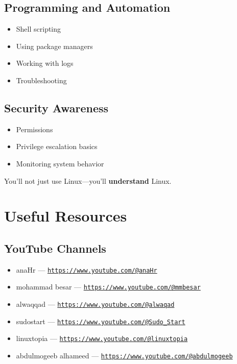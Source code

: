 \documentclass[12pt]{article}
\begin{document}
\subsection*{Programming and Automation}
\begin{itemize}
    \item Shell scripting
    \item Using package managers
    \item Working with logs
    \item Troubleshooting
\end{itemize}

\subsection*{Security Awareness}
\begin{itemize}
    \item Permissions
    \item Privilege escalation basics
    \item Monitoring system behavior
\end{itemize}

\begin{highlightbox}
You'll not just use Linux—you'll \textbf{understand} Linux.
\end{highlightbox}

\section*{Useful Resources}

\subsection*{YouTube Channels}
\begin{itemize}
    \item anaHr — \href{https://www.youtube.com/@anaHr}{\texttt{https://www.youtube.com/@anaHr}}
    \item mohammad besar — \href{https://www.youtube.com/@mmbesar}{\texttt{https://www.youtube.com/@mmbesar}}
    \item alwaqqad — \href{https://www.youtube.com/@alwaqad}{\texttt{https://www.youtube.com/@alwaqad}}
    \item sudostart — \href{https://www.youtube.com/@Sudo\_Start}{\texttt{https://www.youtube.com/@Sudo\_Start}}
    \item linuxtopia — \href{https://www.youtube.com/@linuxtopia}{\texttt{https://www.youtube.com/@linuxtopia}}
    \item  abdulmogeeb alhameed — \href{https://www.youtube.com/@abdulmogeeb}{\texttt{https://www.youtube.com/@abdulmogeeb}}
\end{itemize}
\end{document}
